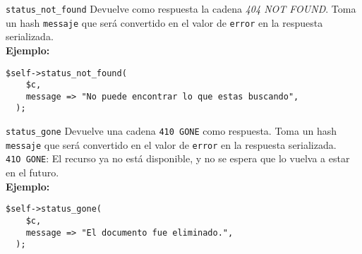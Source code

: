 \begin{frame}[fragile]{\texttt{status\_not\_found}} %
    Devuelve como respuesta la cadena \textit{404 NOT FOUND}. Toma un hash
    \texttt{messaje} que será convertido en el valor de  \texttt{error} en la
    respuesta serializada. \\[0.5cm]

    \textbf{Ejemplo:} 

    \begin{lstlisting}
$self->status_not_found(
    $c,
    message => "No puede encontrar lo que estas buscando",
  );

    \end{lstlisting}

\end{frame}

\begin{frame}[fragile]{\texttt{status\_gone}} %
    Devuelve una cadena \texttt{410 GONE} como respuesta. Toma un hash
    \texttt{messaje} que será convertido en el valor de \texttt{error} en la
    respuesta serializada. \\[0.5cm]

    \texttt{41O GONE}: El recurso ya no está disponible, y no se espera que lo
    vuelva a estar en el futuro. \\[0.5cm]

    \textbf{Ejemplo: }

    \begin{lstlisting}
$self->status_gone(
    $c,
    message => "El documento fue eliminado.",
  );        
    \end{lstlisting}
\end{frame}





